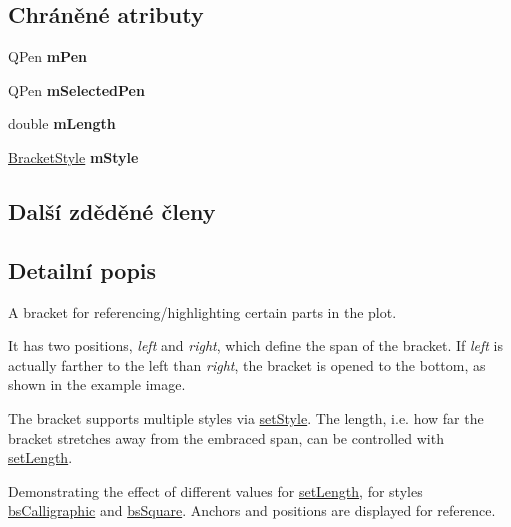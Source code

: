 \subsection*{Chráněné atributy}
\begin{DoxyCompactItemize}
\item 
\hypertarget{classQCPItemBracket_a350c864a5853b04343719f5a8be6b675}{}Q\+Pen {\bfseries m\+Pen}\label{classQCPItemBracket_a350c864a5853b04343719f5a8be6b675}

\item 
\hypertarget{classQCPItemBracket_adcfb53602d1802d00e2de4fd6df6b291}{}Q\+Pen {\bfseries m\+Selected\+Pen}\label{classQCPItemBracket_adcfb53602d1802d00e2de4fd6df6b291}

\item 
\hypertarget{classQCPItemBracket_ab3d99bba8da18eb4d0e0cb23dded33b2}{}double {\bfseries m\+Length}\label{classQCPItemBracket_ab3d99bba8da18eb4d0e0cb23dded33b2}

\item 
\hypertarget{classQCPItemBracket_ac911907184c824d621f274f8e0990080}{}\hyperlink{classQCPItemBracket_a7ac3afd0b24a607054e7212047d59dbd}{Bracket\+Style} {\bfseries m\+Style}\label{classQCPItemBracket_ac911907184c824d621f274f8e0990080}

\end{DoxyCompactItemize}
\subsection*{Další zděděné členy}


\subsection{Detailní popis}
A bracket for referencing/highlighting certain parts in the plot. 

 It has two positions, {\itshape left} and {\itshape right}, which define the span of the bracket. If {\itshape left} is actually farther to the left than {\itshape right}, the bracket is opened to the bottom, as shown in the example image.

The bracket supports multiple styles via \hyperlink{classQCPItemBracket_a612dffa2373422eef8754d690add3703}{set\+Style}. The length, i.\+e. how far the bracket stretches away from the embraced span, can be controlled with \hyperlink{classQCPItemBracket_ac7cfc3da7da9b5c5ac5dfbe4f0351b2a}{set\+Length}.

 \begin{center}Demonstrating the effect of different values for \hyperlink{classQCPItemBracket_ac7cfc3da7da9b5c5ac5dfbe4f0351b2a}{set\+Length}, for styles \hyperlink{classQCPItemBracket_a7ac3afd0b24a607054e7212047d59dbda8f29f5ef754e2dc9a9efdedb2face0f3}{bs\+Calligraphic} and \hyperlink{classQCPItemBracket_a7ac3afd0b24a607054e7212047d59dbda7f9df4a7359bfe3dac1dbe4ccf5d220c}{bs\+Square}. Anchors and positions are displayed for reference.\end{center} 

